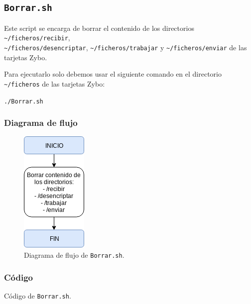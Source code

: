 \subsection{\texttt{Borrar.sh}}
Este script se encarga de borrar el contenido de los directorios \texttt{\textasciitilde/ficheros/recibir},\\ \texttt{\textasciitilde/ficheros/desencriptar}, \texttt{\textasciitilde/ficheros/trabajar} y \texttt{\textasciitilde/ficheros/enviar} de las tarjetas Zybo.

Para ejecutarlo solo debemos usar el siguiente comando en el directorio \texttt{\textasciitilde/ficheros} de las tarjetas Zybo:
\begin{center}
	\texttt{./Borrar.sh}
\end{center}

\subsubsection{Diagrama de flujo}
\begin{figure}[h]
	\centering
	\includegraphics[scale=0.9]{Anexos/Anexo3/Diagramas/Borrar.png}
	\caption{Diagrama de flujo de \texttt{Borrar.sh}.}
	\label{Diagrama de flujo de Borrar.sh}
\end{figure}

\subsubsection{Código}

\begin{center}
	Código de \texttt{Borrar.sh}.
\end{center}
